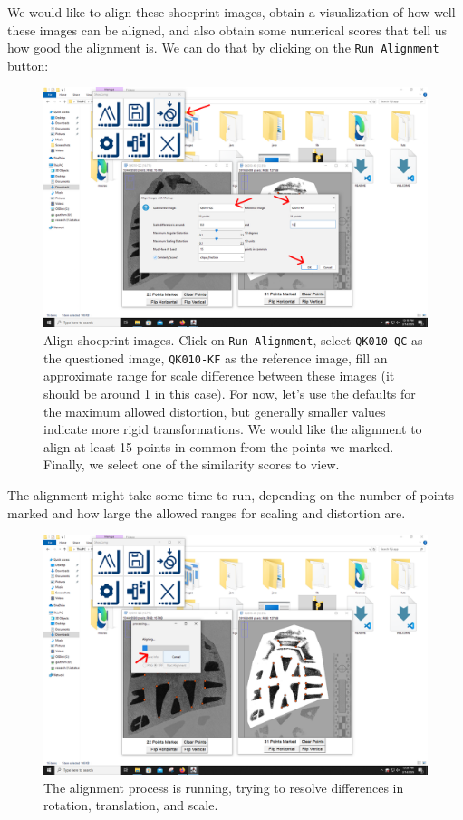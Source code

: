 \documentclass{csafedoc}
\begin{document}
We would like to align these shoeprint images, obtain a visualization of how well these
images can be aligned, and also obtain some numerical scores that tell us how good the
alignment is. We can do that by clicking on the \texttt{Run Alignment} button:

\begin{figure}[H]
	\begin{center}
		\includegraphics[width=0.8\linewidth]{images/step_8a-anno.png}
	\end{center}
	\caption{Align shoeprint images. Click on \texttt{Run Alignment}, select \texttt{QK010-QC} as the questioned image,
		\texttt{QK010-KF} as the reference image, fill an approximate range for scale difference
		between these images (it should be around 1 in this case). For now, let's use the defaults
		for the maximum allowed distortion, but generally smaller values indicate more rigid
		transformations. We would like the alignment to align at least 15 points in common from
		the points we marked. Finally, we select one of the similarity scores to view.}
	\label{fig:step8a}
\end{figure}
\vspace*{-1.5em}
The alignment might take some time to run, depending on the number of points marked and
how large the allowed ranges for scaling and distortion are.

\begin{figure}[H]
	\begin{center}
		\includegraphics[width=0.8\linewidth]{images/step_8b-anno.png}
	\end{center}
	\caption{The alignment process is running, trying to resolve differences in rotation,
		translation, and scale.}
	\label{fig:step8b}
\end{figure}
\end{document}
